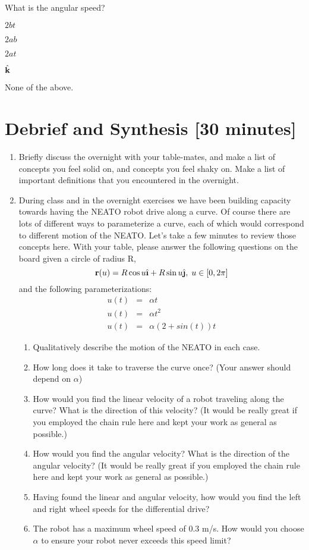 \documentclass{tufte-handout}
\begin{document}
\item What is the angular speed?
\be
\item $2bt$
\item $2ab$
\item $2at$
\item $\hat{\textbf k}$
\item None of the above.
\ee
\ee

\section{Debrief and Synthesis [30 minutes]}

\begin{enumerate}[series=exercises, label=\textbf{Exercise} (\arabic*)]
\item Briefly discuss the overnight with your table-mates, and make a list of concepts you feel solid on, and concepts you feel shaky on. Make a list of important definitions that you encountered in the overnight.
\item During class and in the overnight exercises we have been building capacity towards having the NEATO robot drive along a curve. Of course there are lots of different ways to parameterize a curve, each of which would correspond to different motion of the NEATO. Let's take a few minutes to review those concepts here. With your table, please answer the following questions on the board given a circle of radius R,
\[ \r(u) = R \cos u \ihat + R \sin u \jhat, \; u \in [0,2 \pi] \]
and the following parameterizations:
\begin{eqnarray*}
u(t) &=& \alpha t \\
u(t) &=& \alpha t^2 \\
u(t) &=& \alpha (2 + sin(t)) t
\end{eqnarray*}

\begin{enumerate}
\item Qualitatively describe the motion of the NEATO in each case.
\item How long does it take to traverse the curve once? (Your answer should depend on $\alpha$)
\item How would you find the linear velocity of a robot traveling along the curve? What is the direction of this velocity? (It would be really great if you employed the chain rule here and kept your work as general as possible.)
\item How would you find the angular velocity? What is the direction of the angular velocity? (It would be really great if you employed the chain rule here and kept your work as general as possible.)
\item Having found the linear and angular velocity, how would you find the left and right wheel speeds for the differential drive?
\item The robot has a maximum wheel speed of 0.3 m/s. How would you choose $\alpha$ to ensure your robot never exceeds this speed limit?
\end{enumerate}
\end{enumerate}
\end{document}
